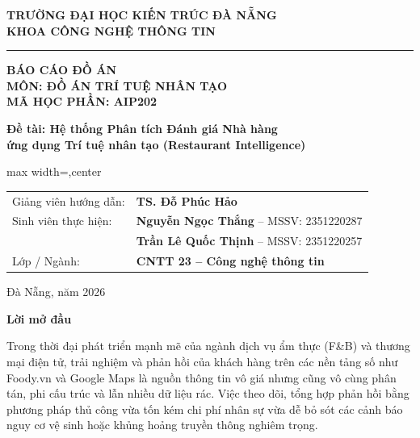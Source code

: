 \documentclass[12pt, a4paper]{article}
\begin{document}
\raggedbottom

\begin{titlepage}
\begin{center}
{\large\bfseries TRƯỜNG ĐẠI HỌC KIẾN TRÚC ĐÀ NẴNG}\\
{\large\bfseries KHOA CÔNG NGHỆ THÔNG TIN}\\[0.2cm]
\rule{0.45\textwidth}{0.8pt}

\vspace{3.5cm}

{\LARGE\bfseries BÁO CÁO ĐỒ ÁN}\\[0.35cm]
{\Large\bfseries MÔN: ĐỒ ÁN TRÍ TUỆ NHÂN TẠO}\\[0.2cm]
{\normalsize\bfseries MÃ HỌC PHẦN: AIP202}

\vspace{1.4cm}

{\Large\bfseries Đề tài: Hệ thống Phân tích Đánh giá Nhà hàng \\ ứng dụng Trí tuệ nhân tạo (Restaurant Intelligence)}

\vspace{2.4cm}

\begin{adjustbox}{max width=\textwidth,center}
\begin{tabular}{ll}
Giảng viên hướng dẫn: & \textbf{TS. Đỗ Phúc Hảo} \\[10pt]
Sinh viên thực hiện:  & \textbf{Nguyễn Ngọc Thắng} -- MSSV: 2351220287 \\[6pt]
                      & \textbf{Trần Lê Quốc Thịnh} -- MSSV: 2351220257 \\[10pt]
Lớp / Ngành:          & \textbf{CNTT 23 -- Công nghệ thông tin} \\
\end{tabular}
\end{adjustbox}

\vfill

Đà Nẵng, năm 2026
\end{center}
\end{titlepage}

\newpage
\begin{center}
{\LARGE\bfseries Lời mở đầu}
\end{center}

Trong thời đại phát triển mạnh mẽ của ngành dịch vụ ẩm thực (F\&B) và thương mại điện tử, trải nghiệm và phản hồi của khách hàng trên các nền tảng số như Foody.vn và Google Maps là nguồn thông tin vô giá nhưng cũng vô cùng phân tán, phi cấu trúc và lẫn nhiều dữ liệu rác. Việc theo dõi, tổng hợp phản hồi bằng phương pháp thủ công vừa tốn kém chi phí nhân sự vừa dễ bỏ sót các cảnh báo nguy cơ vệ sinh hoặc khủng hoảng truyền thông nghiêm trọng.
\end{document}
